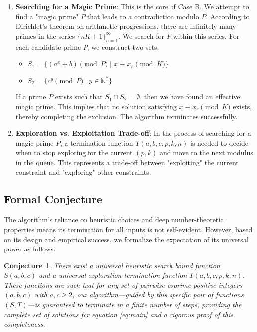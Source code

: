 \documentclass{article}
\newtheorem{conjecture}[theorem]{Conjecture}
\begin{document}
\begin{enumerate}
    \item \textbf{Searching for a Magic Prime}:
    This is the core of Case B. We attempt to find a "magic prime" $P$ that leads to a contradiction modulo $P$. According to Dirichlet's theorem on arithmetic progressions, there are infinitely many primes in the series $\{nK+1\}_{n=1}^{\infty}$. We search for $P$ within this series.
    For each candidate prime $P$, we construct two sets:
    \begin{itemize}
        \item $S_1 = \{ (a^x+b) \pmod P \mid x \equiv x_r \pmod K \}$
        \item $S_2 = \{ c^y \pmod P \mid y \in \mathbb{N}^* \}$
    \end{itemize}
    If a prime $P$ exists such that $S_1 \cap S_2 = \emptyset$, then we have found an effective magic prime. This implies that no solution satisfying $x \equiv x_r \pmod K$ exists, thereby completing the exclusion. The algorithm terminates successfully.
    
    \item \textbf{Exploration vs. Exploitation Trade-off}:
    In the process of searching for a magic prime $P$, a termination function $T(a,b,c,p,k,n)$ is needed to decide when to stop exploring for the current $(p,k)$ and move to the next modulus in the queue. This represents a trade-off between "exploiting" the current constraint and "exploring" other constraints.
\end{enumerate}

\subsection{Formal Conjecture}
The algorithm's reliance on heuristic choices and deep number-theoretic properties means its termination for all inputs is not self-evident. However, based on its design and empirical success, we formalize the expectation of its universal power as follows:
\begin{conjecture}
There exist a universal heuristic search bound function $S(a,b,c)$ and a universal exploration termination function $T(a,b,c,p,k,n)$. These functions are such that for any set of pairwise coprime positive integers $(a,b,c)$ with $a,c \ge 2$, our algorithm---guided by this specific pair of functions $(S,T)$---is guaranteed to terminate in a finite number of steps, providing the complete set of solutions for equation \eqref{eq:main} and a rigorous proof of this completeness.
\end{conjecture}
\end{document}

